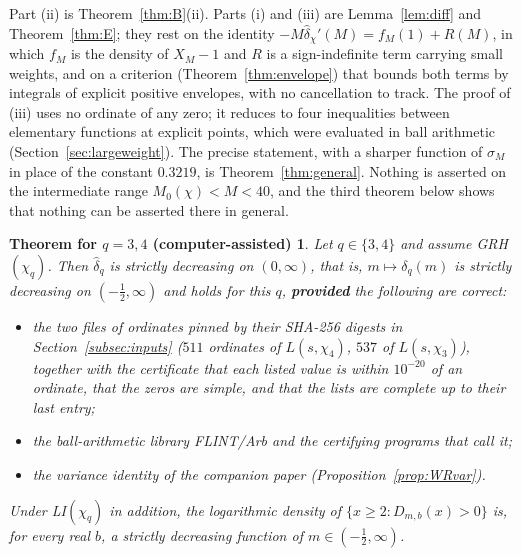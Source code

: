 \documentclass[11pt]{amsart}
\newtheorem*{qthm}{Theorem for $q=3,4$ (computer-assisted)}
\theoremstyle{definition}
\numberwithin{equation}{section}
\newcommand{\hd}{\widehat\delta}
\begin{document}
Part (ii) is Theorem~\ref{thm:B}(ii). Parts (i) and (iii) are
Lemma~\ref{lem:diff} and Theorem~\ref{thm:E}; they rest on the
identity $-M\hd_\chi'(M)=f_M(1)+R(M)$, in which $f_M$ is the density
of $X_M-1$ and $R$ is a sign-indefinite term carrying small weights,
and on a criterion (Theorem~\ref{thm:envelope}) that bounds both terms
by integrals of explicit positive envelopes, with no cancellation to
track. The proof of (iii) uses no ordinate of any zero; it reduces to
four inequalities between elementary functions at explicit points,
which were evaluated in ball arithmetic (Section~\ref{sec:largeweight}).
The precise statement, with a sharper function of $\sigma_M$ in place
of the constant $0.3219$, is Theorem~\ref{thm:general}. Nothing is
asserted on the intermediate range $M_0(\chi)<M<40$, and the third
theorem below shows that nothing can be asserted there in general.

\begin{qthm}
Let $q\in\{3,4\}$ and assume GRH$(\chi_q)$. Then $\hd_q$ is strictly
decreasing on $(0,\infty)$, that is, $m\mapsto\delta_q(m)$ is strictly
decreasing on $(-\tfrac12,\infty)$ and \cite[Conjecture~1]{WR} holds
for this $q$, \textbf{provided} the following are correct:
\begin{itemize}
\item[\textup{(T1)}] the two files of ordinates pinned by their
SHA-256 digests in Section~\ref{subsec:inputs} ($511$ ordinates of
$L(s,\chi_4)$, $537$ of $L(s,\chi_3)$), together with the certificate
that each listed value is within $10^{-20}$ of an ordinate, that the
zeros are simple, and that the lists are complete up to their last
entry;
\item[\textup{(T2)}] the ball-arithmetic library FLINT/Arb and the
certifying programs that call it;
\item[\textup{(T3)}] the variance identity of the companion paper
\cite[eq.~(8)]{WR} (Proposition~\ref{prop:WRvar}).
\end{itemize}
Under LI$(\chi_q)$ in addition, the logarithmic density of
$\{x\ge2:D_{m,b}(x)>0\}$ is, for every real $b$, a strictly decreasing
function of $m\in(-\tfrac12,\infty)$.
\end{qthm}
\end{document}
